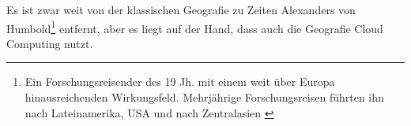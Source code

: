 Es ist zwar weit von der klassischen Geografie zu Zeiten Alexanders von Humbold\footnote{Ein Forschungsreisender des 19 Jh. mit einem weit über Europa hinausreichenden Wirkungsfeld. Mehrjährige Forschungsreisen führten ihn nach Lateinamerika, USA und nach Zentralasien \cite{Kehlmann2005}} entfernt, aber es liegt auf der Hand, dass auch die Geografie Cloud Computing nutzt.